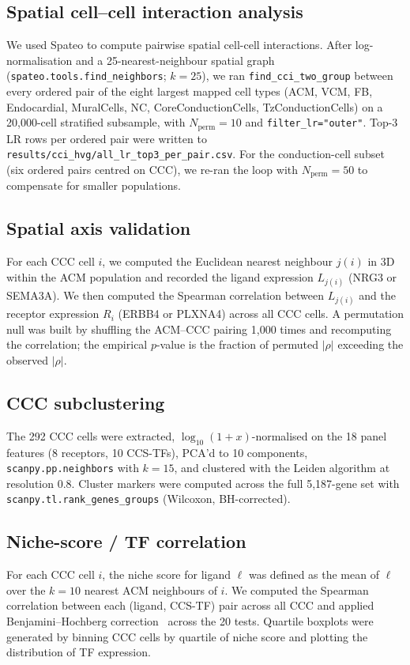 \documentclass[11pt,a4paper]{article}
\begin{document}
\subsection*{Spatial cell--cell interaction analysis}
We used Spateo \citep{qiu2024spateo} to compute pairwise spatial
cell-cell interactions. After log-normalisation and a 25-nearest-neighbour
spatial graph (\texttt{spateo.tools.find\_neighbors}; $k{=}25$), we
ran \texttt{find\_cci\_two\_group} between every ordered pair of the
eight largest mapped cell types (ACM, VCM, FB, Endocardial, MuralCells,
NC, CoreConductionCells, TzConductionCells) on a 20{,}000-cell
stratified subsample, with $N_{\text{perm}}{=}10$ and
\texttt{filter\_lr="outer"}. Top-3 LR rows per ordered pair were
written to \texttt{results/cci\_hvg/all\_lr\_top3\_per\_pair.csv}.
For the conduction-cell subset (six ordered pairs centred on CCC), we
re-ran the loop with $N_{\text{perm}}{=}50$ to compensate for smaller
populations.

\subsection*{Spatial axis validation}
For each CCC cell $i$, we computed the Euclidean nearest neighbour
$j(i)$ in 3D within the ACM population and recorded the ligand
expression $L_{j(i)}$ (NRG3 or SEMA3A). We then computed the Spearman
correlation between $L_{j(i)}$ and the receptor expression $R_i$
(ERBB4 or PLXNA4) across all CCC cells. A permutation null was built
by shuffling the ACM--CCC pairing 1{,}000 times and recomputing the
correlation; the empirical $p$-value is the fraction of permuted
$|\rho|$ exceeding the observed $|\rho|$.

\subsection*{CCC subclustering}
The 292 CCC cells were extracted, $\log_{10}(1+x)$-normalised on the 18
panel features (8 receptors, 10 CCS-TFs), PCA'd to 10 components,
\texttt{scanpy.pp.neighbors} with $k{=}15$, and clustered with the
Leiden algorithm \citep{traag2019leiden} at resolution 0.8.
Cluster markers were computed across the full 5{,}187-gene set with
\texttt{scanpy.tl.rank\_genes\_groups} (Wilcoxon, BH-corrected).

\subsection*{Niche-score / TF correlation}
For each CCC cell $i$, the niche score for ligand $\ell$ was defined as
the mean of $\ell$ over the $k{=}10$ nearest ACM neighbours of $i$. We
computed the Spearman correlation between each (ligand, CCS-TF) pair
across all CCC and applied Benjamini--Hochberg
correction~\citep{benjamini1995fdr} across the 20 tests. Quartile
boxplots were generated by binning CCC cells by quartile of niche score
and plotting the distribution of TF expression.
\end{document}
